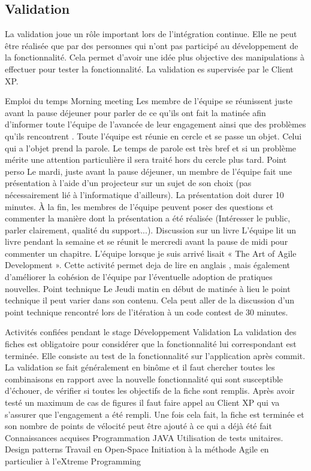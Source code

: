 \documentclass{article}
\begin{document}
\subsection{Validation}
La validation joue un rôle important lors de l'intégration continue. Elle ne peut être réalisée que par des personnes qui n'ont pas participé au développement de la fonctionnalité. Cela permet d'avoir une idée plus objective des manipulations à effectuer pour tester la fonctionnalité. La validation es supervisée par le Client XP.


Emploi du temps
Morning meeting
Les membre de l'équipe se réunissent juste avant la pause déjeuner pour parler de ce qu'ils ont fait la matinée afin d'informer toute l'équipe de l'avancée de leur engagement ainsi que des problèmes qu'ils rencontrent . Toute l'équipe est réunie en cercle et se passe un objet. Celui qui a l'objet prend la parole. Le temps de parole est très bref et si un problème mérite une attention particulière il sera traité hors du cercle plus tard.
Point perso
Le mardi, juste avant la pause déjeuner, un membre de l'équipe fait une présentation à l'aide d'un projecteur sur un sujet de son choix (pas nécessairement lié à l'informatique d'ailleurs). La présentation doit durer 10 minutes. \`A la fin, les membres de l'équipe peuvent poser des questions et commenter la manière dont la présentation a été réalisée (Intéresser le public, parler clairement, qualité du support...).
Discussion sur un livre
L'équipe lit un livre pendant la semaine et se réunit le mercredi avant la pause de midi pour commenter un chapitre. L'équipe lorsque je suis arrivé lisait « The Art of Agile Development ». Cette activité permet deja de lire en anglais , mais également d'améliorer la cohésion de l'équipe par l'éventuelle adoption de pratiques nouvelles.
Point technique
Le Jeudi matin en début de matinée à lieu le point technique il peut varier dans son contenu. Cela peut aller de la discussion d'un point technique rencontré lors de l'itération à un code contest de 30 minutes.


Activités confiées pendant le stage
Développement
Validation
La validation des fiches est obligatoire pour considérer que la fonctionnalité lui correspondant est terminée. Elle consiste au test de la fonctionnalité sur l'application après commit. La validation se fait généralement en binôme et il faut chercher toutes les combinaisons en rapport avec la nouvelle fonctionnalité qui sont susceptible d'échouer, de vérifier si toutes les objectifs de la fiche sont remplis. Après avoir testé un maximum de cas de figures il faut faire appel au Client XP qui va s'assurer que l'engagement a été rempli. Une fois cela fait, la fiche est terminée et son nombre de points de vélocité peut être ajouté à ce qui a déjà été fait
Connaissances acquises
Programmation JAVA
Utilisation de tests unitaires.
Design patterns
Travail en Open-Space
Initiation à la méthode Agile en particulier à l'eXtreme Programming
\end{document}
